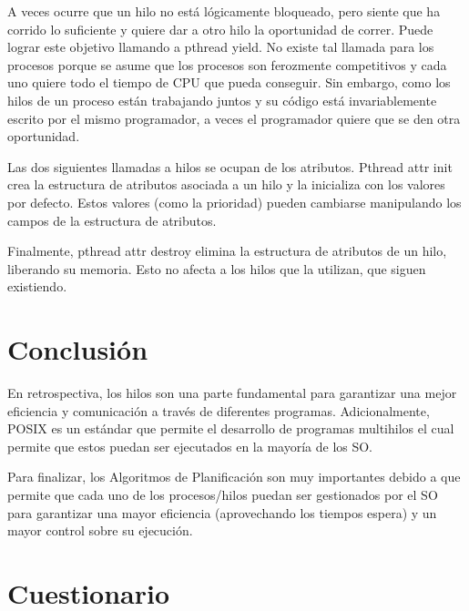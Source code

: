 \documentclass[12pt, a4paper]{article} %
\begin{document}
A veces ocurre que un hilo no está lógicamente bloqueado, pero siente que ha corrido lo suficiente y quiere dar a otro hilo la oportunidad de correr. Puede lograr este objetivo llamando a pthread yield. No existe tal llamada para los procesos porque se asume que los procesos son ferozmente competitivos y cada uno quiere todo el tiempo de CPU que pueda conseguir. Sin embargo, como los hilos de un proceso están trabajando juntos y su código está invariablemente escrito por el mismo programador, a veces el programador quiere que se den otra oportunidad. 

Las dos siguientes llamadas a hilos se ocupan de los atributos. Pthread attr init crea la estructura de atributos asociada a un hilo y la inicializa con los valores por defecto. Estos valores (como la prioridad) pueden cambiarse manipulando los campos de la estructura de atributos.

Finalmente, pthread attr destroy elimina la estructura de atributos de un hilo, liberando su memoria. Esto no afecta a los hilos que la utilizan, que siguen existiendo.

\clearpage
\section{Conclusión}

En retrospectiva, los hilos son una parte fundamental para garantizar una mejor eficiencia y comunicación a través de diferentes programas. Adicionalmente, POSIX es un estándar que permite el desarrollo de programas multihilos el cual permite que estos puedan ser ejecutados en la mayoría de los SO.

Para finalizar, los Algoritmos de Planificación son muy importantes debido a que permite que cada uno de los procesos/hilos puedan ser gestionados por el SO para garantizar una mayor eficiencia (aprovechando los tiempos espera) y un mayor control sobre su ejecución.

\clearpage
\section{Cuestionario}
\end{document}
